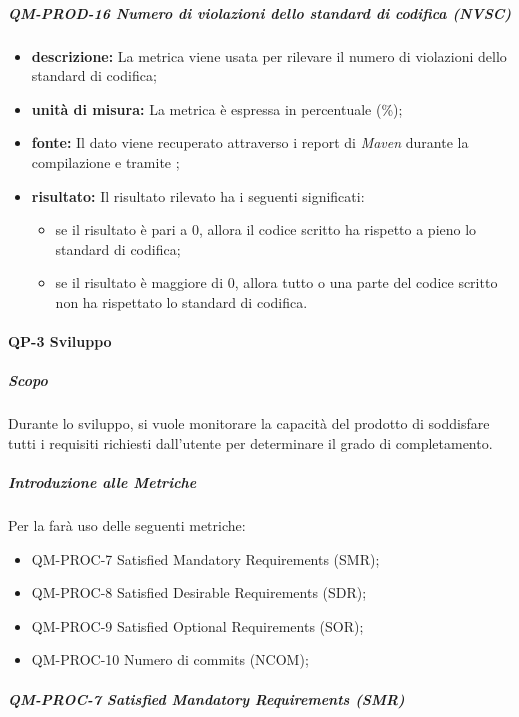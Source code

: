 			\subparagraph{QM-PROD-16 Numero di violazioni dello standard di codifica (NVSC)}
			\begin{itemize}
      			\item \textbf{descrizione: }
					La metrica viene usata per rilevare il numero di violazioni dello standard di codifica;
				\item \textbf{unità di misura: }
					La metrica è espressa in percentuale (\%);
				\item \textbf{fonte: }
					Il dato viene recuperato attraverso i report di \textit{Maven} durante la compilazione e tramite ;
				\item \textbf{risultato: }
					Il risultato rilevato ha i seguenti significati:
					\begin{itemize}
						\item se il risultato è pari a 0, allora il codice scritto ha rispetto a pieno lo standard di codifica;
						\item se il risultato è maggiore di 0, allora tutto o una parte del codice scritto non ha rispettato lo standard di codifica.
					\end{itemize}
			\end{itemize}
			
		

		\paragraph{QP-3 Sviluppo}
			\subparagraph{Scopo}
			Durante lo sviluppo, si vuole monitorare la capacità del prodotto di soddisfare tutti i requisiti richiesti dall'utente per determinare il grado di completamento.

			\subparagraph{Introduzione alle Metriche}
			Per la  farà uso delle seguenti metriche:

			\begin{itemize}
				\item QM-PROC-7 Satisfied Mandatory Requirements (SMR);
				\item QM-PROC-8 Satisfied Desirable Requirements (SDR);
				\item QM-PROC-9 Satisfied Optional Requirements (SOR);
				\item QM-PROC-10 Numero di commits (NCOM);
			\end{itemize}

			\subparagraph{QM-PROC-7 Satisfied Mandatory Requirements (SMR)}

